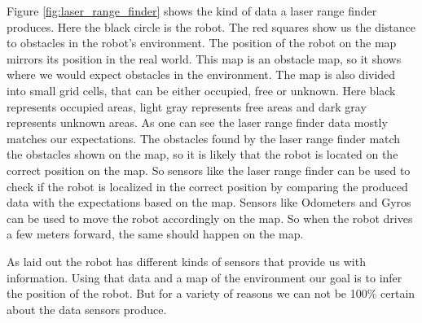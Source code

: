Figure \ref{fig:laser_range_finder} shows the kind of data a laser range finder produces. Here the black circle is the robot. The red squares show us the distance to obstacles in the robot's environment. The position of the robot on the map mirrors its position in the real world. This map is an obstacle map, so it shows where we would expect obstacles in the environment. The map is also divided into small grid cells, that can be either occupied, free or unknown. Here black represents occupied areas, light gray represents free areas and dark gray represents unknown areas. As one can see the laser range finder data mostly matches our expectations. The obstacles found by the laser range finder match the obstacles shown on the map, so it is likely that the robot is located on the correct position on the map. So sensors like the laser range finder can be used to check if the robot is localized in the correct position by comparing the produced data with the expectations based on the map. Sensors like \glspl{Odometer} and \glspl{Gyro} can be used to move the robot accordingly on the map. So when the robot drives a few meters forward, the same should happen on the map. 

As laid out the robot has different kinds of sensors that provide us with information. Using that data and a map of the environment our goal is to infer the position of the robot.  But for a variety of reasons we can not be 100\% certain about the data sensors produce.

